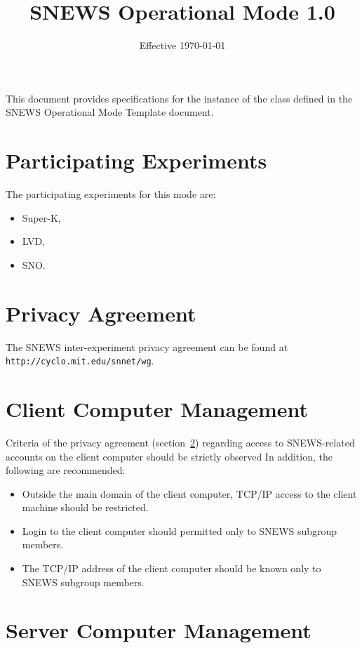 \documentclass{article}
\begin{document}
\title{SNEWS Operational Mode 1.0}         
\date{Effective \today}
\maketitle

This document provides specifications for the instance of
the class defined in the SNEWS Operational Mode Template document.


\section{Participating Experiments}

The participating experiments for this mode are:

\begin{itemize}
\item Super-K,
\item LVD,
\item SNO.
\end{itemize}

\section{Privacy Agreement}\label{privacy}

The SNEWS inter-experiment privacy agreement can be found at \\
{\tt http://cyclo.mit.edu/snnet/wg}.

\section{Client Computer Management}

Criteria of the privacy agreement (section~\ref{privacy}) regarding
access to SNEWS-related accounts on the client computer should be
strictly observed In addition, the following are recommended:

\begin{itemize}
\item Outside the main domain of the 
client computer, TCP/IP access to the client machine should be restricted.
\item Login to the client computer should permitted only to SNEWS subgroup 
members.
\item The TCP/IP address of the client computer should be known only to 
SNEWS subgroup members.
\end{itemize}

\section{Server Computer Management}
\end{document}
